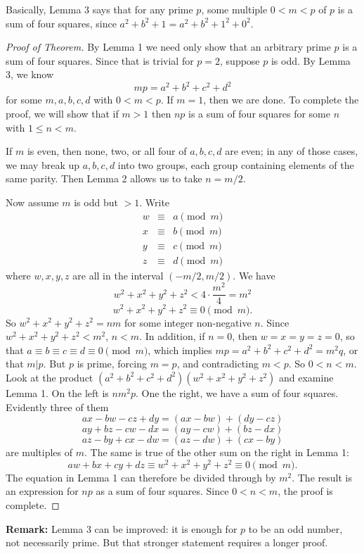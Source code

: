 \documentclass[12pt]{article}
\begin{document}
Basically, Lemma 3 says that for any prime $p$, some multiple $0<m<p$ of $p$ is a sum of four squares, since $a^2+b^2+1=a^2+b^2+1^2+0^2$.

\begin{proof}[Proof of Theorem]  By Lemma 1 we need only show that an arbitrary prime $p$ is a sum of
four squares. Since that is trivial for $p=2$, suppose $p$ is odd. By Lemma 3, we know $$mp=a^2+b^2+c^2+d^2$$
for some $m,a,b,c,d$ with $0<m<p$.  If $m=1$, then we are done.  To complete the proof, we will show that if $m>1$ then $np$ is a sum of four squares for some $n$ with $1\le n<m$.

If $m$ is even, then none, two, or all four of $a,b,c,d$ are even; in any of those cases, we may break up $a,b,c,d$ into two groups, each group containing elements of the same parity.  Then Lemma 2 allows us to take $n = m/2$.

Now assume $m$ is odd but $>1$. Write
\begin{eqnarray*}
       w & \equiv & a\pmod{m} \\
       x & \equiv & b\pmod{m} \\
       y & \equiv & c\pmod{m} \\
       z & \equiv & d\pmod{m}
\end{eqnarray*}
where $w,x,y,z$ are all in the interval $(-m/2, m/2)$. We have
       $$w^2+x^2+y^2+z^2 < 4\cdot \frac{m^2}{4} = m^2$$
       $$w^2+x^2+y^2+z^2\equiv 0\pmod{m}.$$
So $w^2+x^2+y^2+z^2 = nm$ for some integer non-negative $n$.  Since $w^2+x^2+y^2+z^2 < m^2$, $n<m$. In addition, if $n=0$, then $w=x=y=z=0$, so that $a\equiv b\equiv c\equiv d \equiv 0 \pmod m$, which implies $mp=a^2+b^2+c^2+d^2=m^2q$, or that $m|p$.  But $p$ is prime, forcing $m=p$, and contradicting $m<p$.  So $0<n<m$.  Look at the product $(a^2+b^2+c^2+d^2)(w^2+x^2+y^2+z^2)$ and examine Lemma 1. On the left is $nm^2p$. One the right, we have a sum of four squares.  Evidently three of them $$ax-bw-cz+dy=(ax-bw)+(dy-cz)$$ $$ay+bz-cw-dx=(ay-cw)+(bz-dx)$$ $$az-by+cx-dw=(az-dw)+(cx-by)$$
are multiples of $m$. The same is true of the other sum on the
right in Lemma 1:
       $$aw+bx+cy+dz \equiv w^2+x^2+y^2+z^2 \equiv 0\pmod{m}.$$
The equation in Lemma 1 can therefore be divided through by $m^2$.
The result is an expression for $np$ as a sum of four squares.
Since $0<n<m$, the proof is complete.
\end{proof}

\textbf{Remark:} Lemma 3 can be improved: it is enough for
$p$ to be an odd number, not necessarily prime.
But that stronger statement requires a longer proof.
\end{document}
